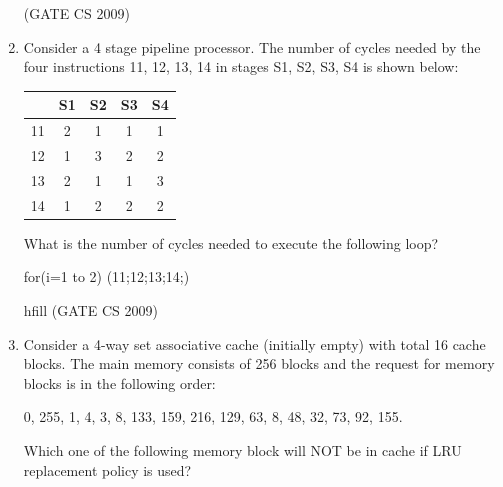 \documentclass[a4paper, 11pt]{article}
\begin{document}
\begin{enumerate}
        \hfill (GATE CS 2009)

    \item Consider a 4 stage pipeline processor. The number of cycles needed by the four instructions 11, 12, 13, 14 in stages S1, S2, S3, S4 is shown below:\\
    \begin{center}
        \begin{tabular}{|c|c|c|c|c|}
    \hline
           & S1  & S2 & S3 & S4 \\
        \hline
        11  & 2  & 1 & 1 & 1 \\
        \hline
        12  & 1  & 3 & 2 & 2 \\
        \hline
        13  & 2  & 1 & 1 & 3 \\
        \hline
        14  & 1  & 2 & 2 & 2 \\
        \hline
    \end{tabular}
    \end{center}
    

        What is the number of cycles needed to execute the following loop?\\
        \begin{center}
        for(i=1 to 2) (11;12;13;14;)\\
        \end{center}
        \begin{enumerate}
        \end{enumerate}

    hfill (GATE CS 2009)

    \item Consider a 4-way set associative cache (initially empty) with total 16 cache blocks. The main memory consists of 256 blocks and the request for memory blocks is in the following order:\\
    
    \begin{center}
        0, 255, 1, 4, 3, 8, 133, 159, 216, 129, 63, 8, 48, 32, 73, 92, 155.\\
    \end{center}
    
    Which one of the following memory block will NOT be in cache if LRU replacement policy is used?\\
        \begin{enumerate}
        \end{enumerate}


\end{enumerate}
\end{document}
